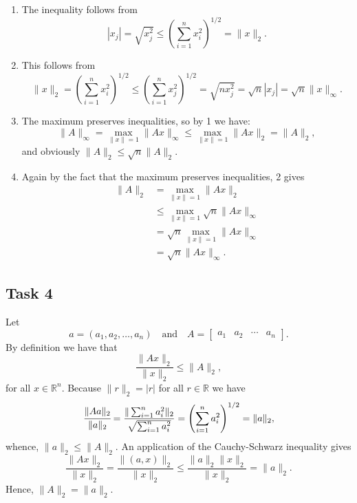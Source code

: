 \documentclass[a4paper,12pt]{article}
\begin{document}
\begin{enumerate}
  \item
    The inequality follows from
    \[
      |x_j|
        = \sqrt{x_j^2}
        \le \left(\sum_{i=1}^n x_i^2\right)^{1/2}
        = \|x\|_2.
    \]

  \item
    This follows from
    \[
      \|x\|_2
        = \left(\sum_{i=1}^n x_i^2\right)^{1/2}
        \le \left(\sum_{i=1}^n x_j^2\right)^{1/2}
        = \sqrt{nx_j^2}
        = \sqrt{n}|x_j|
        = \sqrt{n}\|x\|_\infty.
    \]

  \item
    The maximum preserves inequalities, so by 1 we have:
    \[
      \|A\|_\infty
        = \max_{\|x\| = 1} \|Ax\|_\infty
        \le \max_{\|x\| = 1} \|Ax\|_2
        = \|A\|_2,
    \]
    and obviously \(\|A\|_2 \le \sqrt{n}\|A\|_2\).

  \item
    Again by the fact that the maximum preserves inequalities, 2 gives
    \begin{align*}
      \|A\|_2
      &= \max_{\|x\| = 1} \|Ax\|_2 \\
      &\le \max_{\|x\| = 1} \sqrt{n}\|Ax\|_\infty \\
      &= \sqrt{n} \max_{\|x\| = 1} \|Ax\|_\infty \\
      &= \sqrt{n} \|Ax\|_\infty.
    \end{align*}
\end{enumerate}


\subsection*{Task 4}

Let
\[
  a = (a_1, a_2, \dots, a_n)
  \quad \text{and} \quad
  A =
    \begin{bmatrix}
      a_1 & a_2 & \cdots & a_n
    \end{bmatrix}.
\]
By definition we have that
\[ \frac{\|Ax\|_2}{\|x\|_2} \le \|A\|_2, \]
for all \(x\in \mathbb{R}^n\).
Because \(\|r\|_2 = |r|\) for all \(r \in \mathbb{R}\) we have
\[
  \cfrac{\|Aa\|_2}{\|a\|_2}
    = \frac{\|\sum_{i=1}^n a_i^2\|_2}{\sqrt{\sum_{i=1}^n a_i^2}}
    = \left(\sum_{i=1}^{n} a_i^2\right)^{1/2}
    = \|a\|_2,
\]
whence, \(\|a\|_2\le \|A\|_2\).
An application of the Cauchy-Schwarz inequality gives
\[
  \frac{\|Ax\|_2}{\|x\|_2}
    = \frac{\|(a,x)\|_2}{\|x\|_2}
    \le \frac{\|a\|_2 \|x\|_2}{\|x\|_2}
    = \|a\|_2.
\]
Hence, \(\|A\|_2= \|a\|_2\).
\end{document}
